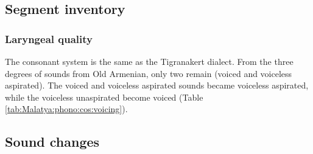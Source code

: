 \subsection{Segment inventory}
\subsubsection{Laryngeal quality}

The consonant system is the same as the Tigranakert dialect. From the three degrees of sounds from Old Armenian, only two remain (voiced and voiceless aspirated). The voiced and voiceless aspirated sounds became voiceless aspirated, while the voiceless unaspirated become voiced (Table \ref{tab:Malatya:phono:cos:voicing}).




\begin{table}[H]
	\centering
	\caption{Laryngeal quality of stops and affricates in the Malatya dialect}
	\label{tab:Malatya:phono:cos:voicing}
\end{table}

\subsection{Sound changes}

